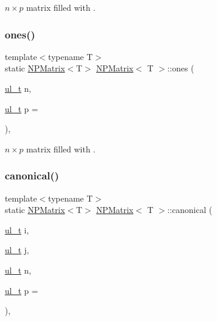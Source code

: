 $ n \times p $ matrix filled with {}. 

\mbox{\label{class_n_p_matrix_a6509ca1d29b8b87f2d437883f48a40c9}} 
\subsubsection{\texorpdfstring{ones()}{ones()}}
{\footnotesize\ttfamily template$<$typename T$>$ \\
static \mbox{\hyperlink{class_n_p_matrix}{N\+P\+Matrix}}$<$T$>$ \mbox{\hyperlink{class_n_p_matrix}{N\+P\+Matrix}}$<$ T $>$\+::ones (\begin{DoxyParamCaption}\item[{\mbox{\hyperlink{group___n_algebra_ga1b140a2034db3f5dfe18a987745df43a}{ul\+\_\+t}}}]{n,  }\item[{\mbox{\hyperlink{group___n_algebra_ga1b140a2034db3f5dfe18a987745df43a}{ul\+\_\+t}}}]{p = {} }\end{DoxyParamCaption})\hspace{0.3cm}{\ttfamily [inline]}, {\ttfamily [static]}}



$ n \times p $ matrix filled with {}. 

\mbox{\label{class_n_p_matrix_abda10c35b77af6785cb5cf069ff099e7}} 
\subsubsection{\texorpdfstring{canonical()}{canonical()}}
{\footnotesize\ttfamily template$<$typename T$>$ \\
static \mbox{\hyperlink{class_n_p_matrix}{N\+P\+Matrix}}$<$T$>$ \mbox{\hyperlink{class_n_p_matrix}{N\+P\+Matrix}}$<$ T $>$\+::canonical (\begin{DoxyParamCaption}\item[{\mbox{\hyperlink{group___n_algebra_ga1b140a2034db3f5dfe18a987745df43a}{ul\+\_\+t}}}]{i,  }\item[{\mbox{\hyperlink{group___n_algebra_ga1b140a2034db3f5dfe18a987745df43a}{ul\+\_\+t}}}]{j,  }\item[{\mbox{\hyperlink{group___n_algebra_ga1b140a2034db3f5dfe18a987745df43a}{ul\+\_\+t}}}]{n,  }\item[{\mbox{\hyperlink{group___n_algebra_ga1b140a2034db3f5dfe18a987745df43a}{ul\+\_\+t}}}]{p = {} }\end{DoxyParamCaption})\hspace{0.3cm}{\ttfamily [inline]}, {\ttfamily [static]}}



